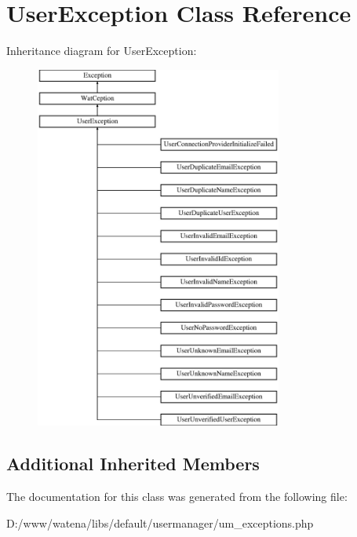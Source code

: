 \hypertarget{class_user_exception}{\section{User\-Exception Class Reference}
\label{class_user_exception}
}
Inheritance diagram for User\-Exception\-:\begin{figure}[H]
\begin{center}
\leavevmode
\includegraphics[height=12.000000cm]{class_user_exception}
\end{center}
\end{figure}
\subsection*{Additional Inherited Members}


The documentation for this class was generated from the following file\-:\begin{DoxyCompactItemize}
\item 
D\-:/www/watena/libs/default/usermanager/um\-\_\-exceptions.\-php\end{DoxyCompactItemize}

